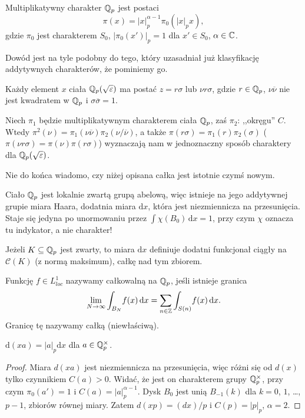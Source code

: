 \begin{fakt}
	Multiplikatywny charakter $\mathbb Q_p$ jest postaci \[\pi(x) = |x|_p^{\alpha - 1} \pi_0(|x|_p x),\] gdzie $\pi_0$ jest charakterem $S_0$, $|\pi_0(x')|_p = 1$ dla $x' \in S_0$, $\alpha \in \mathbb C$.
\end{fakt}

Dowód jest na tyle podobny do tego, który uzasadniał już klasyfikację addytywnych charakterów, że pominiemy go.

Każdy element $x$ ciała $\mathbb Q_p (\sqrt{\varepsilon})$ ma postać $z = r \sigma$ lub $ \nu r \sigma$, gdzie $r \in \mathbb Q_p$, $\nu \overline \nu$ nie jest kwadratem w $\mathbb Q_p$ i $\sigma \overline \sigma = 1$.

\begin{fakt}
	Niech $\pi_1$ będzie multiplikatywnym charakterem ciała $\mathbb Q_p$, zaś $\pi_2$: ,,okręgu'' $C$.
	Wtedy $\pi^2(\nu) = \pi_1(\nu \overline \nu) \pi_2 (\nu / \overline \nu)$, a także $\pi(r \sigma) = \pi_1(r)\pi_2(\sigma)$ ($\pi(\nu r \sigma) = \pi(\nu)\pi(r\sigma)$) wyznaczają nam w jednoznaczny sposób charaktery dla $\mathbb Q_p(\sqrt \varepsilon)$.
\end{fakt}

Nie do końca wiadomo, czy niżej opisana całka jest istotnie czymś nowym.

Ciało $\mathbb Q_p$ jest lokalnie zwartą grupą abelową, więc istnieje na jego addytywnej grupie miara Haara, dodatnia miara $\textrm{d}x$, która jest niezmiennicza na przesunięcia.
Staje się jedyna po unormowaniu przez $\int \chi(B_0) \,\textrm{d}x = 1$, przy czym $\chi$ oznacza tu indykator, a nie charakter!

Jeżeli  $K \subseteq \mathbb Q_p$ jest zwarty, to miara $\textrm{d}x$ definiuje dodatni funkcjonał ciągły na $\mathcal C(K)$ (z normą maksimum), całkę nad tym zbiorem.

\begin{definicja}
	Funkcję $f \in L^1_{loc}$ nazywamy całkowalną na $\mathbb Q_p$, jeśli istnieje granica
	\[
		\lim_{N \to \infty} \int_{B_N} \! f(x)\,\textrm{d}x = \sum_{n \in \mathbb Z} \int_{S(n)} \!f(x)\,\textrm{d}x.
	\]
	Granicę tę nazywamy całką (niewłaściwą).
\end{definicja}

\begin{fakt}
$\textrm{d}(xa) = |a|_p \textrm{d}x$ dla $a \in \mathbb Q_p^\times$.
\end{fakt}

\begin{proof}
	Miara $d(xa)$ jest niezmiennicza na przesunięcia, więc różni się od $d(x)$ tylko czynnikiem $C(a) > 0$.
	Widać, że jest on charakterem grupy $\mathbb Q_p^\times$, przy czym $\pi_0(a') = 1$ i $C(a) = |a|_p^{\alpha - 1}$.
	Dysk $B_0$ jest unią $B_{-1}(k)$ dla $k = 0$, $1$, \ldots, $p-1$, zbiorów równej miary.
	Zatem $d(xp) = (dx)/p$ i $C(p) = |p|_p$, $\alpha = 2$.
\end{proof}

